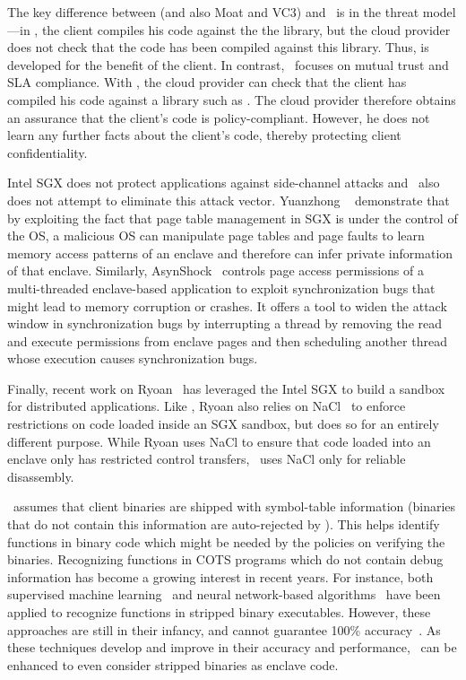 The key difference between  (and also Moat and VC3) and
\tool\ is in the threat model---in , the client compiles
his code against the the  library, but the cloud provider
does not check that the code has been compiled against this library. Thus,
 is developed for the benefit of the client.  In contrast,
\tool\ focuses on mutual trust and SLA compliance. With \tool, the cloud
provider can check that the client has compiled his code against a library such
as . The cloud provider therefore obtains an assurance that
the client's code is policy-compliant. However, he does not learn any further
facts about the client's code, thereby protecting client confidentiality.

Intel SGX does not protect applications against side-channel attacks and \tool\
also does not attempt to eliminate this attack vector. Yuanzhong
\etal~\cite{controlledchannel:oak15} demonstrate that by exploiting the fact
that page table management in SGX is under the control of the OS, a malicious
OS can manipulate page tables and page faults to learn memory access patterns
of an enclave and therefore can infer private information of that enclave.
Similarly, AsynShock~\cite{asyncshock:esorics16} controls page access
permissions of a multi-threaded enclave-based application to exploit
synchronization bugs that might lead to memory corruption or crashes. It offers
a tool to widen the attack window in synchronization bugs by interrupting a
thread by removing the read and execute permissions from enclave pages and then
scheduling another thread whose execution causes synchronization bugs.

Finally, recent work on Ryoan~\cite{hunt:osdi16} has leveraged the Intel SGX to
build a sandbox for distributed applications. Like \tool, Ryoan also relies on
NaCl~\cite{nativeclient:oak09} to enforce restrictions on code loaded inside an
SGX sandbox, but does so for an entirely different purpose. While Ryoan uses
NaCl to ensure that code loaded into an enclave only has restricted control
transfers, \tool\ uses NaCl only for reliable disassembly.

 \tool\ assumes that client
binaries are shipped with symbol-table information (binaries that do not
contain this information are auto-rejected by \tool). This helps identify
functions in binary code which might be needed by the policies on verifying the
binaries. Recognizing functions in COTS programs which do not contain debug
information has become a growing interest in recent years.  For instance, both 
supervised machine learning~\cite{binaryanalysis:AAAI08} and neural
network-based algorithms~\cite{functionrecognizing:usenixsec15} have been
applied to recognize functions in stripped binary executables. However, these
approaches are still in their infancy, and cannot guarantee 100\%
accuracy~\cite{functionrecognizing:usenixsec15}. As these techniques develop
and improve in their accuracy and performance, \tool\ can be enhanced to even
consider stripped binaries as enclave code.

